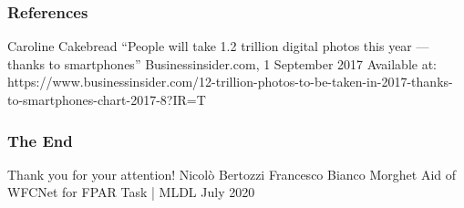 \documentclass{beamer}
\begin{document}
\begin{frame}
\frametitle{References}
   \begin{thebibliography}{9}
		Caroline Cakebread
		\newblock “People will take 1.2 trillion digital photos this year — thanks to smartphones”
		\newblock Businessinsider.com, 1 September 2017
		\newblock Available at: https://www.businessinsider.com/12-trillion-photos-to-be-taken-in-2017-thanks-to-smartphones-chart-2017-8?IR=T
   \end{thebibliography}
\end{frame}

\begin{frame}
\centering
\frametitle{The End}
\Huge Thank you for your attention!
\break
\break
\break
\break
\large Nicolò Bertozzi
\break
Francesco Bianco Morghet
\break
\break
Aid of WFCNet for FPAR Task | MLDL
 July 2020
\end{frame}
\end{document}
